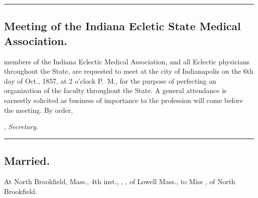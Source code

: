 \fancybreak{* * *}
\subsection*{Meeting of the Indiana Ecletic State Medical Association.}

 members of the Indiana Eclectic Medical Association, and all
Eclectic physicians throughout the State, are requested to meet at the
city of Indianapolis on the 6th day of Oct., 1857, at 2 o'clock P.~M.,
for the purpose of perfecting an organization of the faculty throughout
the State. A general attendance is earnestly solicited as business of importance
to the profession will come before the meeting. By order,

\hfill{}, \emph{Secretary}.

\fancybreak{* * *}
\subsection*{Married.}

\footnotesize
At North Brookfield, Mass., 4th inst., , \md, of Lowell Mass., to Miss
, of North Brookfield.
\normalsize
\clearpage
